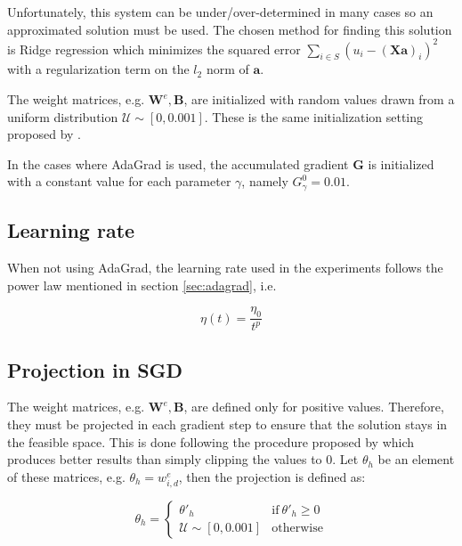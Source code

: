 Unfortunately, this system can be under/over-determined in many cases so an approximated solution must be used. The chosen method for finding this solution is Ridge regression which minimizes the squared error $\sum_{i \in S}(u_{i} - (\mathbf{X}\mathbf{a})_{i})^{2}$ with a regularization term on the $l_{2}$ norm of $\mathbf{a}$.

The weight matrices, e.g. $\mathbf{W}^{e}, \mathbf{B}$, are initialized with random values drawn from a uniform distribution $\mathcal{U} \sim [0, 0.001]$. These is the same initialization setting proposed by \citet{tschiatschek16learning}.

In the cases where AdaGrad is used, the accumulated gradient $\mathbf{G}$ is initialized with a constant value for each parameter $\gamma$, namely $G^{0}_{\gamma} = 0.01$.

\subsection{Learning rate}

When not using AdaGrad, the learning rate used in the experiments follows the power law mentioned in section \ref{sec:adagrad}, i.e.

\begin{equation}
  \eta(t) = \frac{\eta_{0}}{t^{p}}
\end{equation}

\subsection{Projection in SGD}

The weight matrices, e.g. $\mathbf{W}^{e}, \mathbf{B}$, are defined only for positive values. Therefore, they must be projected in each gradient step to ensure that the solution stays in the feasible space. This is done following the procedure proposed by \citet{tschiatschek16learning} which produces better results than simply clipping the values to 0. Let $\theta_{h}$ be an element of these matrices, e.g. $\theta_{h} = w^{e}_{i,d}$, then the projection is defined as:

\begin{equation}
  \theta_{h} = \begin{cases}
    \theta'_{h} & \text{if}\ \theta'_{h} \geq 0 \\
    \mathcal{U} \sim [0, 0.001] & \text{otherwise}
  \end{cases}
\end{equation}

